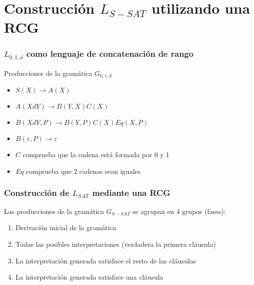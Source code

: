 \documentclass{beamer}
\begin{document}
\section{Construcción $L_{S-SAT}$ utilizando una RCG}
\begin{frame}
    \frametitle{$L_{0,1,d}$ como lenguaje de concatenación de rango}
    
    Producciones de la gramática $G_{0,1,d}$
    \begin{itemize}
        \item $S(X)\to A(X)$
              \pause
        \item $A(XdY)\to B(Y,X)C(X)$
              \pause
        \item $B(XdY,P)\to B(Y,P) C(X) Eq(X,P)$
              \pause
        \item $B(\varepsilon,P)\to \varepsilon$
    \end{itemize}
    \vspace{0.5cm}
    \begin{itemize}
        \item $C$ comprueba que la cadena está formada por 0 y 1
              \pause
        \item $Eq$ comprueba que 2 cadenas sean iguales
    \end{itemize}
\end{frame}

\begin{frame}
    \frametitle{Construcción de $L_{SAT}$ mediante una RCG}
    
    Las producciones de la gramática $G_{S-SAT}$ se agrupan en 4 grupos (fases):
    
    \begin{enumerate}
        \item Derivación inicial de la gramática
              \pause
        \item Todas las posibles interpretaciones (verdadera la primera cláusula)
              \pause
        \item La interpretación generada satisface el resto de las cláusulas
              \pause
        \item La interpretación generada satisface una cláusula
    \end{enumerate}
    
\end{frame}
\end{document}
